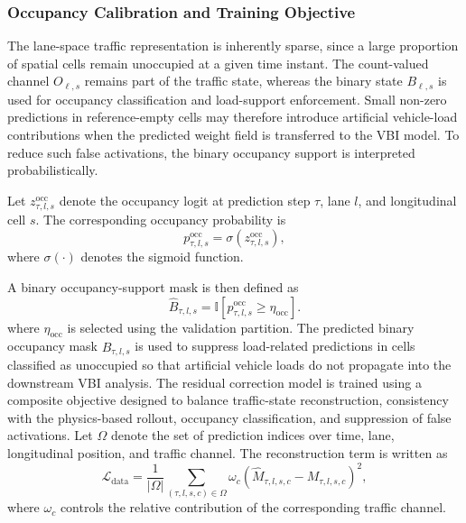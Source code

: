 \documentclass[journal]{IEEEtran}
\begin{document}
\subsubsection{Occupancy Calibration and Training Objective}
\label{sec:occupancy_training}

The lane-space traffic representation is inherently sparse, since a large proportion of spatial cells remain unoccupied at a given time instant. The count-valued channel $O_{\ell,s}$ remains part of the traffic state, whereas the binary state $B_{\ell,s}$ is used for occupancy classification and load-support enforcement. Small non-zero predictions in reference-empty cells may therefore introduce artificial vehicle-load contributions when the predicted weight field is transferred to the VBI model. To reduce such false activations, the binary occupancy support is interpreted probabilistically.

Let $z_{\tau,l,s}^{\mathrm{occ}}$ denote the occupancy logit at prediction step $\tau$, lane $l$, and longitudinal cell $s$. The corresponding occupancy probability is
\begin{equation}
p_{\tau,l,s}^{\mathrm{occ}} = \sigma\left(z_{\tau,l,s}^{\mathrm{occ}}\right),
\end{equation}
where $\sigma(\cdot)$ denotes the sigmoid function.

A binary occupancy-support mask is then defined as
\begin{equation}
\widehat{B}_{\tau,l,s} = \mathbb{I}\left[p^{\mathrm{occ}}_{\tau,l,s}\geq\eta_{\mathrm{occ}}\right].
\label{eq:predicted_binary_occupancy}
\end{equation}
where $\eta_{\mathrm{occ}}$ is selected using the validation partition. The predicted binary occupancy mask \(\hat B_{\tau,l,s}\) is used to suppress load-related predictions in cells classified as unoccupied so that artificial vehicle loads do not propagate into the downstream VBI analysis.
The residual correction model is trained using a composite objective designed to balance traffic-state reconstruction, consistency with the physics-based rollout, occupancy classification, and suppression of false activations. Let $\Omega$ denote the set of prediction indices over time, lane, longitudinal position, and traffic channel. The reconstruction term is written as
\begin{equation}
\mathcal{L}_{\mathrm{data}} = \frac{1}{|\Omega|}\sum_{(\tau,l,s,c)\in\Omega}\omega_c\left(\widehat{M}_{\tau,l,s,c}-M_{\tau,l,s,c}\right)^2,
\end{equation}
where $\omega_c$ controls the relative contribution of the corresponding traffic channel.
\end{document}
